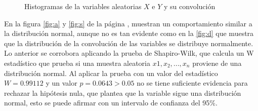 \documentclass{article}
\begin{document}
\begin{figure}
\label{fig:d}
\centering
\caption{Histogramas de la variables aleatorias $X$ e $Y$ y su convolución}
\label{fig:1} 
\end{figure}
 En la figura \ref{fig:a} y \ref{fig:s} de la página \pageref{fig:1}, muestran un comportamiento similar a la distribución normal, aunque no es tan evidente como en la \ref{fig:d} que muestra que la distribución de la convolución de las variables se distribuye normalmente. Lo anterior se corrobora aplicando la prueba de Shapiro-Wilk, que calcula un W estadístico que prueba si una muestra aleatoria $x{1}, x_{2},...,x_{n}$ proviene de una distribución normal. Al aplicar la prueba con un valor del estadístico $W=0.99112$ y un valor $p=0.0643>0.05$ no se tiene suficiente evidencia para rechazar la hipótesis nula, que plantea que la variable sigue una distribución normal, esto se puede afirmar con un intervalo de confianza del 95\%.
\end{document}
